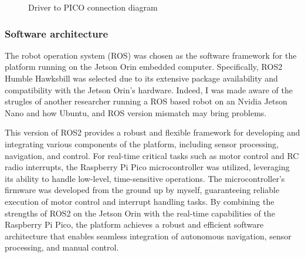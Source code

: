 \documentclass[11pt]{article}
\begin{document}
                
                
                \begin{figure}[h]
                    \centering
                    Driver to PICO connection diagram
                    \label{fig:driver_to_pico}
                \end{figure}

            
            
            \subsubsection{Software architecture}


            The robot operation system (ROS) was chosen as the software framework for the platform running on the Jetson Orin embedded computer. Specifically, ROS2 Humble Hawksbill was selected due to its extensive package availability and compatibility with the Jetson Orin's hardware. Indeed, I was made aware of the strugles of another researcher running a ROS based robot on an Nvidia Jetson Nano and how Ubuntu, and ROS version mismatch may bring problems. 
            
            This version of ROS2 provides a robust and flexible framework for developing and integrating various components of the platform, including sensor processing, navigation, and control. For real-time critical tasks such as motor control and RC radio interrupts, the Raspberry Pi Pico microcontroller was utilized, leveraging its ability to handle low-level, time-sensitive operations. The microcontroller's firmware was developed from the ground up by myself, guaranteeing reliable execution of motor control and interrupt handling tasks. By combining the strengths of ROS2 on the Jetson Orin with the real-time capabilities of the Raspberry Pi Pico, the platform achieves a robust and efficient software architecture that enables seamless integration of autonomous navigation, sensor processing, and manual control.
\end{document}

